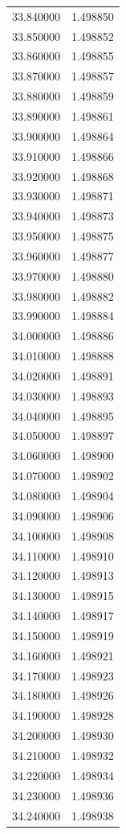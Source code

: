 \begin{tabular}{rr}
33.840000 & 1.498850 \\
33.850000 & 1.498852 \\
33.860000 & 1.498855 \\
33.870000 & 1.498857 \\
33.880000 & 1.498859 \\
33.890000 & 1.498861 \\
33.900000 & 1.498864 \\
33.910000 & 1.498866 \\
33.920000 & 1.498868 \\
33.930000 & 1.498871 \\
33.940000 & 1.498873 \\
33.950000 & 1.498875 \\
33.960000 & 1.498877 \\
33.970000 & 1.498880 \\
33.980000 & 1.498882 \\
33.990000 & 1.498884 \\
34.000000 & 1.498886 \\
34.010000 & 1.498888 \\
34.020000 & 1.498891 \\
34.030000 & 1.498893 \\
34.040000 & 1.498895 \\
34.050000 & 1.498897 \\
34.060000 & 1.498900 \\
34.070000 & 1.498902 \\
34.080000 & 1.498904 \\
34.090000 & 1.498906 \\
34.100000 & 1.498908 \\
34.110000 & 1.498910 \\
34.120000 & 1.498913 \\
34.130000 & 1.498915 \\
34.140000 & 1.498917 \\
34.150000 & 1.498919 \\
34.160000 & 1.498921 \\
34.170000 & 1.498923 \\
34.180000 & 1.498926 \\
34.190000 & 1.498928 \\
34.200000 & 1.498930 \\
34.210000 & 1.498932 \\
34.220000 & 1.498934 \\
34.230000 & 1.498936 \\
34.240000 & 1.498938 \\

\end{tabular}
